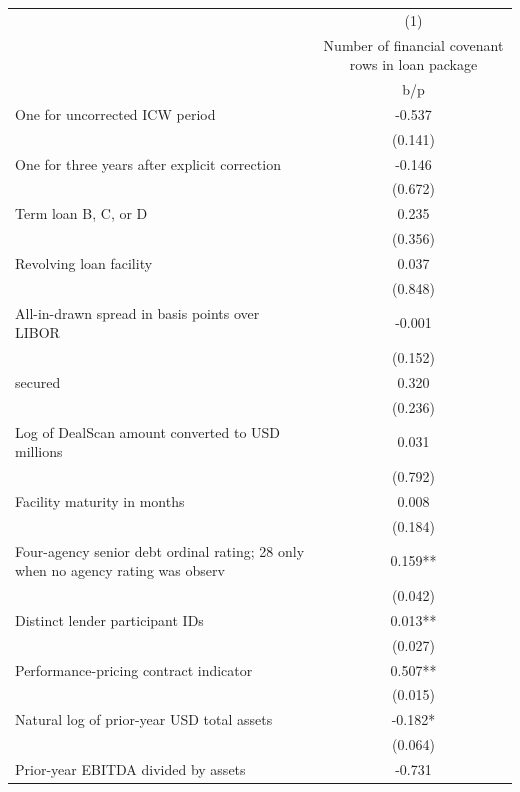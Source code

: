 {
\def\sym#1{\ifmmode^{#1}\else\(^{#1}\)\fi}
\begin{tabular}{l*{1}{c}}
\hline\hline
                    &\multicolumn{1}{c}{(1)}\\
                    &\multicolumn{1}{c}{Number of financial covenant rows in loan package}\\
                    &         b/p   \\
\hline
One for uncorrected ICW period&      -0.537   \\
                    &     (0.141)   \\
One for three years after explicit correction&      -0.146   \\
                    &     (0.672)   \\
Term loan B, C, or D&       0.235   \\
                    &     (0.356)   \\
Revolving loan facility&       0.037   \\
                    &     (0.848)   \\
All-in-drawn spread in basis points over LIBOR&      -0.001   \\
                    &     (0.152)   \\
secured             &       0.320   \\
                    &     (0.236)   \\
Log of DealScan amount converted to USD millions&       0.031   \\
                    &     (0.792)   \\
Facility maturity in months&       0.008   \\
                    &     (0.184)   \\
Four-agency senior debt ordinal rating; 28 only when no agency rating was observ&       0.159** \\
                    &     (0.042)   \\
Distinct lender participant IDs&       0.013** \\
                    &     (0.027)   \\
Performance-pricing contract indicator&       0.507** \\
                    &     (0.015)   \\
Natural log of prior-year USD total assets&      -0.182*  \\
                    &     (0.064)   \\
Prior-year EBITDA divided by assets&      -0.731   \\

\end{tabular}}
